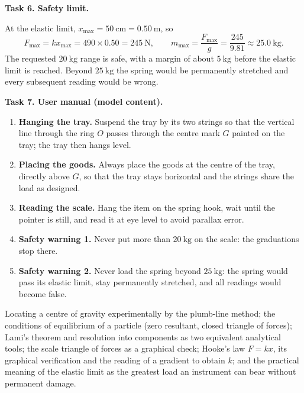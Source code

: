 \documentclass[11pt]{article}
\begin{document}
\textbf{Task 6. Safety limit.}

At the elastic limit, $x_{\max} = 50\ \mathrm{cm} = 0.50\ \mathrm{m}$, so
\[ F_{\max} = kx_{\max} = 490 \times 0.50 = 245\ \mathrm{N}, \qquad m_{\max} = \frac{F_{\max}}{g} = \frac{245}{9.81} \approx 25.0\ \mathrm{kg}. \]
The requested $20\ \mathrm{kg}$ range is safe, with a margin of about $5\ \mathrm{kg}$ before the elastic limit is reached. Beyond $25\ \mathrm{kg}$ the spring would be permanently stretched and every subsequent reading would be wrong.

\textbf{Task 7. User manual (model content).}

\begin{methode}
\begin{enumerate}
\item \textbf{Hanging the tray.} Suspend the tray by its two strings so that the vertical line through the ring $O$ passes through the centre mark $G$ painted on the tray; the tray then hangs level.
\item \textbf{Placing the goods.} Always place the goods at the centre of the tray, directly above $G$, so that the tray stays horizontal and the strings share the load as designed.
\item \textbf{Reading the scale.} Hang the item on the spring hook, wait until the pointer is still, and read it at eye level to avoid parallax error.
\item \textbf{Safety warning 1.} Never put more than $20\ \mathrm{kg}$ on the scale: the graduations stop there.
\item \textbf{Safety warning 2.} Never load the spring beyond $25\ \mathrm{kg}$: the spring would pass its elastic limit, stay permanently stretched, and all readings would become false.
\end{enumerate}
\end{methode}

\begin{aretenir}
Locating a centre of gravity experimentally by the plumb-line method; the conditions of equilibrium of a particle (zero resultant, closed triangle of forces); Lami's theorem and resolution into components as two equivalent analytical tools; the scale triangle of forces as a graphical check; Hooke's law $F = kx$, its graphical verification and the reading of a gradient to obtain $k$; and the practical meaning of the elastic limit as the greatest load an instrument can bear without permanent damage.
\end{aretenir}
\end{document}
